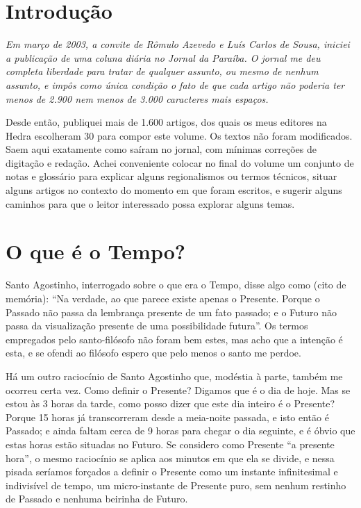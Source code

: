 \pagestyle{myheadings}
\oneside %
\paginabranca

\chapter{Introdução}

{\itshape
Em março de 2003, a convite de Rômulo Azevedo e Luís Carlos de
Sousa, iniciei a publicação de uma coluna diária no Jornal
da Paraíba.  O jornal me deu completa liberdade para tratar
de qualquer assunto, ou mesmo de nenhum assunto, e impôs como única
condição o fato de que cada artigo não poderia ter menos de 2.900 nem
menos de 3.000 caracteres mais espaços.

Desde então, publiquei mais de 1.600 artigos, dos quais os meus
editores na Hedra escolheram 30 para compor este volume.  Os textos
não foram modificados.  Saem aqui exatamente como saíram no jornal,
com mínimas correções de digitação e redação.  Achei conveniente
colocar no final do volume um conjunto de notas e glossário para
explicar alguns regionalismos ou termos técnicos, situar alguns
artigos no contexto do momento em que foram escritos, e sugerir
alguns caminhos para que o leitor interessado possa explorar alguns
temas.}

\chapter{O que é o Tempo?}

Santo Agostinho, interrogado sobre o que era o Tempo, disse algo como
(cito de memória): “Na verdade, ao que parece existe apenas o
Presente. Porque o Passado não passa da lembrança presente de um fato
passado; e o Futuro não passa da visualização presente de uma
possibilidade futura”.  Os termos empregados pelo santo-filósofo não
foram bem estes, mas acho que a intenção é esta, e se ofendi ao
filósofo espero que pelo menos o santo me perdoe.

Há um outro raciocínio de Santo Agostinho que, modéstia à parte,
também me ocorreu certa vez. Como definir o Presente? Digamos que é o
dia de hoje. Mas se estou às 3 horas da tarde, como posso dizer que
este dia inteiro é o Presente? Porque 15 horas já transcorreram desde
a meia-noite passada, e isto então é Passado; e ainda faltam cerca de
9 horas para chegar o dia seguinte, e é óbvio que estas horas estão
situadas no Futuro. Se considero como Presente “a presente hora”, o
mesmo raciocínio se aplica aos minutos em que ela se divide, e nessa
pisada seríamos forçados a definir o Presente como um instante
infinitesimal e indivisível de tempo, um micro-instante de Presente
puro, sem nenhum restinho de Passado e nenhuma beirinha de Futuro. 

